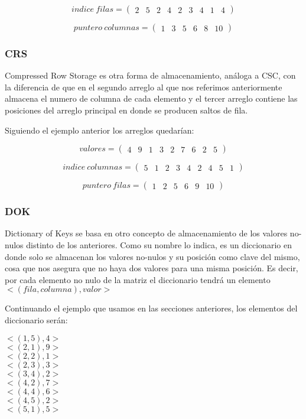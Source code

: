 \[ indice\ filas = \left( \begin{array}{ccccccccc}
2 & 5 & 2 & 4 & 2 & 3 & 4 & 1 & 4\end{array} 
\right)\] 

\[ puntero\ columnas = \left( \begin{array}{cccccc}
1 & 3 & 5 & 6 & 8 & 10\end{array} 
\right)\] 

\subsubsection{CRS}
Compressed Row Storage es otra forma de almacenamiento, análoga a CSC, con la diferencia de que en el segundo arreglo al que nos referimos anteriormente almacena el numero de columna de cada elemento y el tercer arreglo contiene las posiciones del arreglo principal en donde se producen saltos de fila.

Siguiendo el ejemplo anterior los arreglos quedarían:

\[ valores= \left( \begin{array}{ccccccccc}
4 & 9 & 1 & 3 & 2 & 7 & 6 & 2 & 5\end{array} 
\right)\] 

\[ indice\ columnas = \left( \begin{array}{ccccccccc}
5 & 1 & 2 & 3 & 4 & 2 & 4 & 5 & 1\end{array} 
\right)\] 

\[ puntero\ filas = \left( \begin{array}{cccccc}
1 & 2 & 5 & 6 & 9 & 10\end{array} 
\right)\] 

\subsubsection{DOK}
Dictionary of Keys se basa en otro concepto de almacenamiento de los valores no-nulos distinto de los anteriores. Como su nombre lo indica, es un diccionario en donde solo se almacenan los valores no-nulos y su posición como clave del mismo, cosa que nos asegura que no haya dos valores para una misma posición. Es decir, por cada elemento no nulo de la matriz el diccionario tendrá un elemento $<(fila, columna), valor>$

Continuando el ejemplo que usamos en las secciones anteriores, los elementos del diccionario serán:
\begin{center}

$<(1, 5), 4>$\\
$<(2, 1), 9>$\\
$<(2, 2), 1>$\\
$<(2, 3), 3>$\\
$<(3, 4), 2>$\\
$<(4, 2), 7>$\\
$<(4, 4), 6>$\\
$<(4, 5), 2>$\\
$<(5, 1), 5>$

\end{center}


